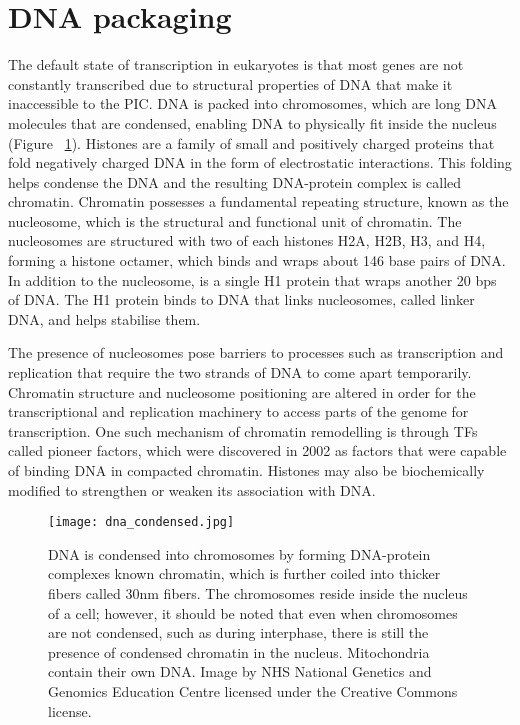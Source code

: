 \section{DNA packaging}

The default state of transcription in eukaryotes is that most genes are not constantly transcribed due to structural properties of DNA that make it inaccessible to the PIC. DNA is packed into chromosomes, which are long DNA molecules that are condensed, enabling DNA to physically fit inside the nucleus (Figure ~\ref{fig:dna_condensed}). Histones are a family of small and positively charged proteins that fold negatively charged DNA in the form of electrostatic interactions. This folding helps condense the DNA and the resulting DNA-protein complex is called chromatin. Chromatin possesses a fundamental repeating structure\cite{holde01111974}, known as the nucleosome, which is the structural and functional unit of chromatin. The nucleosomes are structured with two of each histones H2A, H2B, H3, and H4, forming a histone octamer, which binds and wraps about 146 base pairs of DNA. In addition to the nucleosome, is a single H1 protein that wraps another 20 bps of DNA. The H1 protein binds to DNA that links nucleosomes, called linker DNA, and helps stabilise them.

The presence of nucleosomes pose barriers to processes such as transcription and replication that require the two strands of DNA to come apart temporarily. Chromatin structure and nucleosome positioning are altered in order for the transcriptional and replication machinery to access parts of the genome for transcription. One such mechanism of chromatin remodelling is through TFs called pioneer factors, which were discovered in 2002 as factors that were capable of binding DNA in compacted chromatin\cite{pmid11864602}. Histones may also be biochemically modified to strengthen or weaken its association with DNA.

\begin{figure}[!ht]
   \centering
   \texttt{[image: dna\_condensed.jpg]}
   \caption[Condensation of DNA]{DNA is condensed into chromosomes by forming DNA-protein complexes known chromatin, which is further coiled into thicker fibers called 30nm fibers. The chromosomes reside inside the nucleus of a cell; however, it should be noted that even when chromosomes are not condensed, such as during interphase, there is still the presence of condensed chromatin in the nucleus. Mitochondria contain their own DNA. Image by NHS National Genetics and Genomics Education Centre licensed under the Creative Commons license.}
   \label{fig:dna_condensed}
\end{figure}


